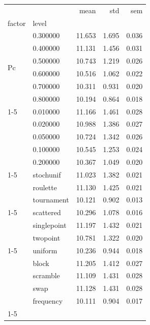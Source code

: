 \begin{tabular}{llrrr}
\toprule
 &  & mean & std & sem \\
factor & level &  &  &  \\
\midrule
\multirow[t]{6}{*}{Pc} & 0.300000 & 11.653 & 1.695 & 0.036 \\
 & 0.400000 & 11.131 & 1.456 & 0.031 \\
 & 0.500000 & 10.743 & 1.219 & 0.026 \\
 & 0.600000 & 10.516 & 1.062 & 0.022 \\
 & 0.700000 & 10.311 & 0.931 & 0.020 \\
 & 0.800000 & 10.194 & 0.864 & 0.018 \\
\cline{1-5}
\multirow[t]{5}{*}{Pm} & 0.010000 & 11.166 & 1.461 & 0.028 \\
 & 0.020000 & 10.988 & 1.386 & 0.027 \\
 & 0.050000 & 10.724 & 1.342 & 0.026 \\
 & 0.100000 & 10.545 & 1.253 & 0.024 \\
 & 0.200000 & 10.367 & 1.049 & 0.020 \\
\cline{1-5}
\multirow[t]{3}{*}{Selection} & stochunif & 11.023 & 1.382 & 0.021 \\
 & roulette & 11.130 & 1.425 & 0.021 \\
 & tournament & 10.121 & 0.902 & 0.013 \\
\cline{1-5}
\multirow[t]{3}{*}{Crossover fn} & scattered & 10.296 & 1.078 & 0.016 \\
 & singlepoint & 11.197 & 1.432 & 0.021 \\
 & twopoint & 10.781 & 1.322 & 0.020 \\
\cline{1-5}
\multirow[t]{5}{*}{Mutation fn} & uniform & 10.236 & 0.944 & 0.018 \\
 & block & 11.205 & 1.412 & 0.027 \\
 & scramble & 11.109 & 1.431 & 0.028 \\
 & swap & 11.128 & 1.431 & 0.028 \\
 & frequency & 10.111 & 0.904 & 0.017 \\
\cline{1-5}
\bottomrule
\end{tabular}
